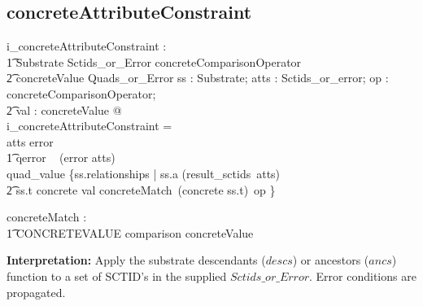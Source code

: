 \documentclass{article}
\begin{document}
\subsection{concreteAttributeConstraint}


\begin{gendef}
  i\_concreteAttributeConstraint : \\
\t1 Substrate \fun Sctids\_or\_Error \fun concreteComparisonOperator \fun\\
\t2 concreteValue \fun Quads\_or\_Error
\where
   \forall ss : Substrate; atts : Sctids\_or\_error; op : concreteComparisonOperator; \\
\t2 val : concreteValue @ \\
i\_concreteAttributeConstraint = \\
\IF atts \in \ran error \\
\t1 \THEN qerror ~ (error \inv atts) \\
   \ELSE quad\_value \{ss.relationships | ss.a \in (result\_sctids~atts) \land \\
\t2 ss.t \in \ran concrete \land val \in concreteMatch~(concrete \inv ss.t)~op \}
\end{gendef}

\begin{gendef}
   concreteMatch : \\
\t1 CONCRETEVALUE \fun comparison \fun concreteValue
\end{gendef}

\noindent
\textbf{Interpretation:}  Apply the substrate descendants ($descs$) or ancestors ($ancs$) function to a set of SCTID's in the supplied
$Sctids\_or\_Error$.  Error conditions are propagated.
\end{document}
